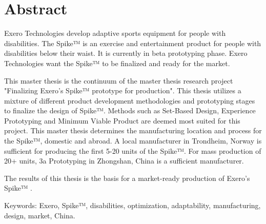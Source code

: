\thispagestyle{plain}			%

\section*{Abstract}
Exero Technologies develop adaptive sports equipment for people with disabilities. The Spike™ is an exercise and entertainment product for people with disabilities below their waist. It is currently in beta prototyping phase. Exero Technologies want the Spike™ to be finalized and ready for the market. 
\par
This master thesis is the continuum of the master thesis research project "Finalizing Exero's Spike™ prototype for production". This thesis utilizes a mixture of different product development methodologies and prototyping stages to finalize the design of Spike™. Methods such as Set-Based Design, Experience Prototyping and Minimum Viable Product are deemed most suited for this project. This master thesis determines the manufacturing location and process for the Spike™, domestic and abroad. A local manufacturer in Trondheim, Norway is sufficient for producing the first 5-20 units of the Spike™. For mass production of 20+ units, 3a Prototyping in Zhongshan, China is a sufficient manufacturer.
\par
The results of this thesis is the basis for a market-ready production of Exero's Spike™ . 

\vfill
Keywords: Exero, Spike™, disabilities, optimization, adaptability, manufacturing, design, market, China.

\newpage				%
\thispagestyle{empty}
\mbox{}